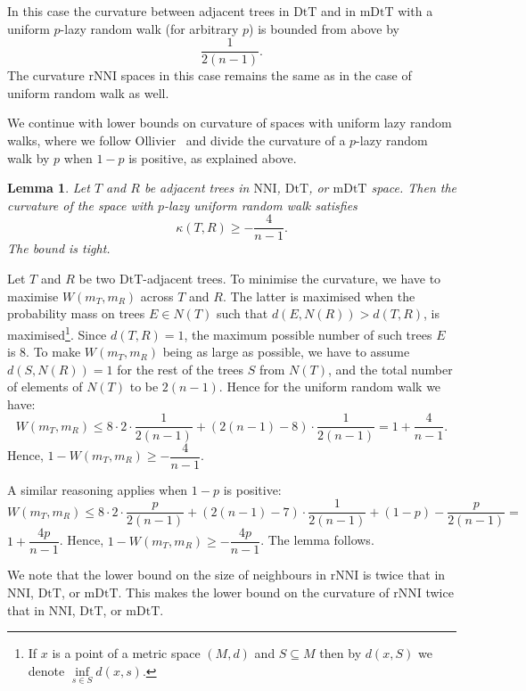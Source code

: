 \documentclass{amsart}
\newtheorem{lemma}{Lemma}
\newcommand{\dts}{\mathrm{DtT}}
\newcommand{\nni}{\mathrm{NNI}}
\newcommand{\rnni}{\mathrm{rNNI}}
\newcommand{\mdts}{\mathrm{mDtT}}
\begin{document}
In this case the curvature between adjacent trees in $\dts$ and in $\mdts$ with a uniform $p$-lazy random walk (for arbitrary $p$) is bounded from above by
\[
\frac{1}{2(n-1)}.
\]
The curvature $\rnni$ spaces in this case remains the same as in the case of uniform random walk as well.

We continue with lower bounds on curvature of spaces with uniform lazy random walks, where we follow Ollivier~\cite{Ollivier2009-cj} and divide the curvature of a $p$-lazy random walk by $p$ when $1-p$ is positive, as explained above.

\begin{lemma}\label{uniformLower}
Let $T$ and $R$ be adjacent trees in $\nni$, $\dts$, or $\mdts$ space.
Then the curvature of the space with $p$-lazy uniform random walk satisfies
\[
\kappa(T,R) \geq -\frac{4}{n-1}.
\]
The bound is tight.
\end{lemma}

\proof
Let $T$ and $R$ be two $\dts$-adjacent trees. To minimise the curvature, we have
to maximise $W(m_T, m_R)$ across $T$ and $R$. The latter is maximised when the probability mass
on trees $E\in N(T)$ such that $d(E, N(R)) > d(T, R)$, is
maximised\footnote{If $x$ is a point of a metric space $(M,d)$ and
$S \subseteq M$ then by $d(x,S)$ we denote $\inf\limits_{s \in S} d(x,s)$.}.
Since $d(T, R) = 1$, the maximum possible number of such trees $E$ is
$8$. To make $W(m_T,m_R)$ being as large as possible, we have to assume
$d(S, N(R)) = 1$ for the rest of the trees $S$ from $N(T)$, and the
total number of elements of $N(T)$ to be $2(n-1)$.
Hence for the uniform random walk we have:
\[
W(m_T,m_R)\leq 8 \cdot 2 \cdot \frac{1}{2(n - 1)} +
(2(n - 1) - 8) \cdot \frac{1}{2(n-1)} = 1 + \dfrac{4}{n-1}.
\]
Hence, $1 - W(m_T,m_R) \geq - \dfrac{4}{n-1}$.

A similar reasoning applies when $1-p$ is positive:
\[
W(m_T,m_R)\leq 8 \cdot 2 \cdot \frac{p}{2(n - 1)} +
(2(n - 1) - 7) \cdot \frac{1}{2(n-1)} + (1-p) - \frac{p}{2(n-1)} =
\]
$1 + \dfrac{4p}{n-1}$. Hence,
$1 - W(m_T,m_R) \geq - \dfrac{4p}{n-1}$. The lemma follows.
\endproof

We note that the lower bound on the size of neighbours in $\rnni$ is twice that in $\nni$, $\dts$, or $\mdts$.
This makes the lower bound on the curvature of $\rnni$ twice that in $\nni$, $\dts$, or $\mdts$.
\end{document}
